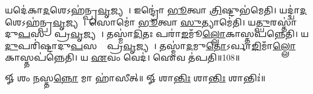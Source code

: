 𑌯𑌦𑍇॑𑌕𑌾\ul{𑌦}𑌶𑍇𑌽𑌹॑𑌨𑍍𑌪𑍍𑌰\ul{𑌵𑍃}𑌜𑍍𑌯𑌤𑍇᳚। 
𑌇𑌨𑍍𑌦𑍍𑌰𑍋॑ \ul{𑌭𑍂}𑌤𑍍𑌵𑌾 \ul{𑌤𑍍𑌰𑌿}𑌷𑍍𑌟𑍁𑌭॑𑌮𑍇𑌤𑌿। 
𑌯𑌦𑍍𑌦𑍍𑌵𑌾॑\ul{𑌦}𑌶𑍇𑌽𑌹॑𑌨𑍍𑌪𑍍𑌰\-\ul{𑌵𑍃}𑌜𑍍𑌯𑌤𑍇᳚। 
𑌸𑍋𑌮𑍋॑ \ul{𑌭𑍂}𑌤𑍍𑌵𑌾 \ul{𑌸𑍁}𑌤𑍍𑌯𑌾𑌮𑍇॑𑌤𑌿। 
𑌯\ul{𑌤𑍍𑌪𑍁}𑌰𑌸𑍍𑌤𑌾॑𑌦𑍁\ul{𑌪}𑌸𑌦𑌾𑌂᳚ 𑌪𑍍𑌰\ul{𑌵𑍃}𑌜𑍍𑌯𑌤𑍇᳚। 
𑌤𑌸𑍍𑌮𑌾॑\ul{𑌦𑌿}𑌤𑌃 𑌪𑌰𑌾॑\ul{𑌙}𑌮𑍂𑌁\ul{𑌲𑍍𑌲𑍋}𑌕𑌾\-𑌸𑍍𑌤𑌪॑𑌨𑍍𑌨𑍇𑌤𑌿। 
𑌯\ul{𑌦𑍁}𑌪𑌰𑌿॑𑌷𑍍𑌟𑌾𑌦𑍁\ul{𑌪}𑌸𑌦𑌾𑌂᳚ 𑌪𑍍𑌰\ul{𑌵𑍃}𑌜𑍍𑌯𑌤𑍇᳚। 
𑌤𑌸𑍍𑌮𑌾॑\ul{𑌦}𑌮𑍁\ul{𑌤𑍋}𑌽𑌰𑍍𑌵𑌾\-\ul{𑌙𑌿}𑌮𑌾𑌁\ul{𑌲𑍍𑌲𑍋}𑌕𑌾\-𑌸𑍍𑌤𑌪॑𑌨𑍍𑌨𑍇𑌤𑌿। 
𑌯 \ul{𑌏}𑌵𑌂 𑌵𑍇𑌦॑। 
𑌐𑌵 𑌤॑𑌪𑌤𑌿॥108॥
\anuvakamend[𑌨𑌕𑍍𑌷॑𑌤𑍍𑌰𑌾𑌣𑍍𑌯𑍇𑌤𑌿 \ul{𑌵𑌿}𑌰𑌾𑌜॑𑌮𑍇𑌤𑌿 𑌤𑌪𑌤𑌿]

𑍐 𑌶𑌂 \ul{𑌨}𑌸𑍍𑌤\ul{𑌨𑍍𑌨𑍋} 𑌮𑌾 𑌹𑌾॑𑌸𑍀𑌤𑍍॥ 𑍐 𑌶𑌾\ul{𑌨𑍍𑌤𑌿𑌃} 𑌶𑌾\ul{𑌨𑍍𑌤𑌿𑌃} 𑌶𑌾𑌨𑍍𑌤𑌿𑌃॑॥

\closesection
